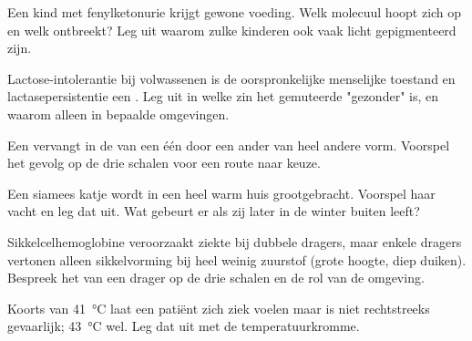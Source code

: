 \begin{exercise}[$\star\star$]\label{exo:g11:enzymes-and-phenotype:8}
Een kind met fenylketonurie krijgt gewone voeding. Welk molecuul hoopt
zich op en welk ontbreekt? Leg uit waarom zulke kinderen ook vaak licht
gepigmenteerd zijn.
\end{exercise}

\begin{exercise}[$\star\star$]\label{exo:g11:enzymes-and-phenotype:9}
Lactose-intolerantie bij volwassenen is de oorspronkelijke menselijke
toestand en lactasepersistentie een . Leg uit in welke zin het
gemuteerde  "gezonder" is, en waarom alleen in bepaalde
omgevingen.
\end{exercise}

\begin{exercise}[$\star\star$]\label{exo:g11:enzymes-and-phenotype:10}
Een  vervangt in de  van een  één 
door een ander van heel andere vorm. Voorspel het gevolg op de drie
schalen voor een route naar keuze.
\end{exercise}

\begin{exercise}[$\star\star$]\label{exo:g11:enzymes-and-phenotype:11}
Een siamees katje wordt in een heel warm huis grootgebracht. Voorspel
haar vacht en leg dat uit. Wat gebeurt er als zij later in de winter
buiten leeft?
\end{exercise}

\begin{exercise}[$\star\star\star$]\label{exo:g11:enzymes-and-phenotype:12}
Sikkelcelhemoglobine veroorzaakt ziekte bij dubbele dragers, maar enkele
dragers vertonen alleen sikkelvorming bij heel weinig zuurstof (grote
hoogte, diep duiken). Bespreek het  van een drager op de drie
schalen en de rol van de omgeving.
\end{exercise}

\begin{exercise}[$\star\star\star$]\label{exo:g11:enzymes-and-phenotype:13}
Koorts van \qty{41}{\celsius} laat een patiënt zich ziek voelen maar is
niet rechtstreeks gevaarlijk; \qty{43}{\celsius} wel. Leg dat uit met de
temperatuurkromme.
\end{exercise}


